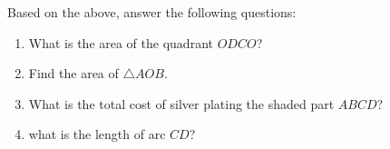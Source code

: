 \documentclass{article}
\begin{document}
\begin{enumerate}
Based on the above, answer the following questions:
\begin{enumerate}[label=(\roman*)]
    \item What is the area of the quadrant $ODCO$?
    \item Find the area of $\triangle  AOB$.
    \item What is the total cost of silver plating the shaded part $ABCD$?
    \item what is the length of arc $CD$?
\end{enumerate}


\end{enumerate}
\end{document}
